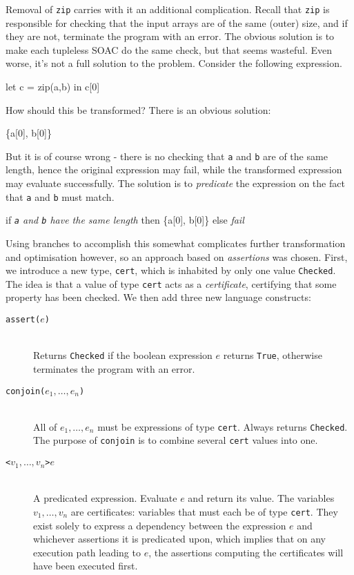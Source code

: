 Removal of \texttt{zip} carries with it an additional complication.
Recall that \texttt{zip} is responsible for checking that the input
arrays are of the same (outer) size, and if they are not, terminate
the program with an error.  The obvious solution is to make each
tupleless SOAC do the same check, but that seems wasteful.  Even
worse, it's not a full solution to the problem.  Consider the
following expression.
\begin{colorcode}
let c = zip(a,b) in
c[0]
\end{colorcode}
How should this be transformed?  There is an obvious solution:
\begin{colorcode}
\{a[0], b[0]\}
\end{colorcode}
But it is of course wrong - there is no checking that \texttt{a} and
\texttt{b} are of the same length, hence the original expression may
fail, while the transformed expression may evaluate successfully.  The
solution is to \textit{predicate} the expression on the fact that
\texttt{a} and \texttt{b} must match.
\begin{colorcode}
if \textit{\texttt{a} and \texttt{b} have the same length}
then \{a[0], b[0]\}
else \textit{fail}
\end{colorcode}
Using branches to accomplish this somewhat complicates further
transformation and optimisation however, so an approach based on
\textit{assertions} was chosen.  First, we introduce a new type,
\texttt{cert}, which is inhabited by only one value \texttt{Checked}.
The idea is that a value of type \texttt{cert} acts as a
\textit{certificate}, certifying that some property has been checked.
We then add three new language constructs:

\begin{description}
\item[\texttt{assert($e$)}]\hfill\\
  Returns \texttt{Checked} if the boolean expression $e$ returns
  \texttt{True}, otherwise terminates the program with an error.

\item[\texttt{conjoin($e_{1}, \ldots, e_{n}$)}]\hfill\\
  All of $e_{1}, \ldots, e_{n}$ must be expressions of type
  \texttt{cert}.  Always returns \texttt{Checked}.  The purpose of
  \texttt{conjoin} is to combine several \texttt{cert} values into
  one.

\item[\texttt{<$v_{1},\ldots,v_{n}$>$e$}]\hfill\\
  A predicated expression.  Evaluate $e$ and return its value.  The
  variables $v_{1},\ldots,v_{n}$ are certificates: variables that must
  each be of type \texttt{cert}.  They exist solely to express a
  dependency between the expression $e$ and whichever assertions it is
  predicated upon, which implies that on any execution path leading to
  $e$, the assertions computing the certificates will have been
  executed first.
\end{description}

